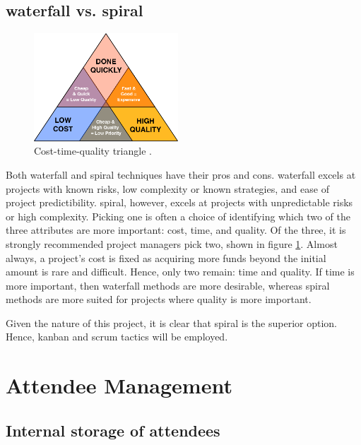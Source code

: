 \documentclass[11pt]{article}
\begin{document}
\subsection{\Gls{waterfall} vs. \Gls{spiral}}

\begin{figure}
    \vspace{0pt}
    \includegraphics[width=0.48\textwidth]{figures/cost-time-quality_triangle.png}
    \caption{Cost-time-quality triangle \cite{ctq-triangle}.}
    \label{fig:ctq-triangle}
\end{figure}

Both \gls{waterfall} and \gls{spiral} techniques have their pros and cons. \Gls{waterfall} excels at projects with known risks, low complexity or known strategies, and ease of project predictibility. \Gls{spiral}, however, excels at projects with unpredictable risks or high complexity. Picking one is often a choice of identifying which two of the three attributes are more important: cost, time, and quality. Of the three, it is strongly recommended project managers pick two, shown in figure \ref{fig:ctq-triangle}. Almost always, a project's cost is fixed as acquiring more funds beyond the initial amount is rare and difficult. Hence, only two remain: time and quality. If time is more important, then \gls{waterfall} methods are more desirable, whereas \gls{spiral} methods are more suited for projects where quality is more important.

Given the nature of this project, it is clear that \gls{spiral} is the superior option. Hence, \Gls{kanban} and \Gls{scrum} tactics will be employed.

\newpage

\section{Attendee Management}

\subsection{Internal storage of attendees}
\end{document}
